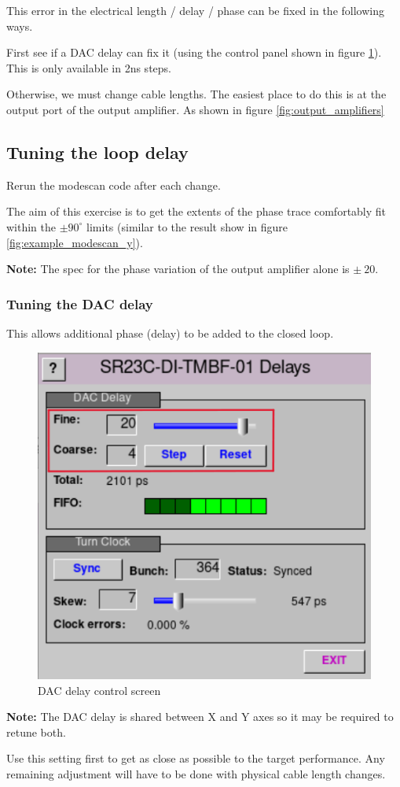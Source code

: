 \documentclass{report}
\begin{document}
This error in the electrical length / delay / phase can be fixed in the following ways. 

First see if a DAC delay can fix it (using the control panel shown in figure \ref{fig:DAC_delay_screen}). This is only available in 2ns steps.

Otherwise, we must change cable lengths. The easiest place to do this is at the output port of the output amplifier. As shown in figure \ref{fig:output_amplifiers}
\clearpage
\subsection{Tuning the loop delay} 

Rerun the modescan code after each change.

The aim of this exercise is to get the extents of the phase trace comfortably fit within the $\pm90^\circ$ limits (similar to the result show in figure \ref{fig:example_modescan_y}). 

\textbf{Note:} The spec for the phase variation of the output amplifier alone is $\pm~20$.

\subsubsection{Tuning the DAC delay} 
This allows additional phase (delay) to be added to the closed loop.
\begin{figure}[ht]
    \centering
    \includegraphics[width=0.5\linewidth]{DAC_delay.png}
    \caption{DAC delay control screen}
    \label{fig:DAC_delay_screen}
\end{figure}
\textbf{Note:} The DAC delay is shared between X and Y axes so it may be required to retune both.

Use this setting first to get as close as possible to the target performance. Any remaining adjustment will have to be done with physical cable length changes. 
\clearpage
\end{document}
